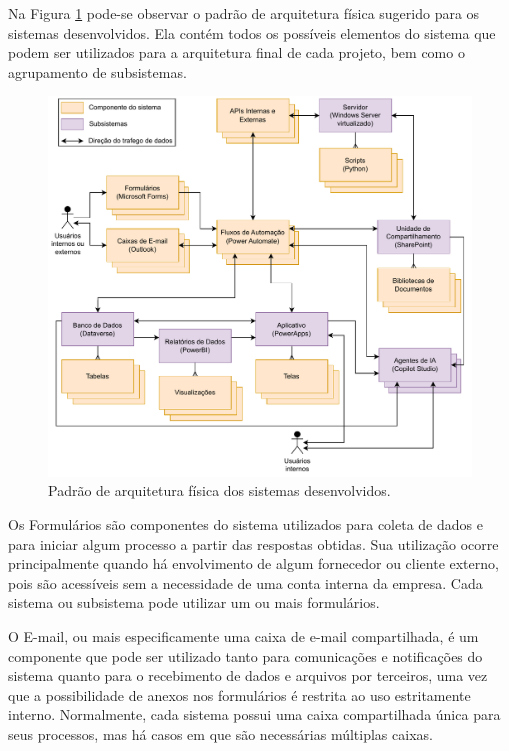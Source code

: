 	Na Figura \ref{fig:metodologia:arquiteturaFisica} pode-se observar o padrão de arquitetura física sugerido para os sistemas desenvolvidos. Ela contém todos os possíveis elementos do sistema que podem ser utilizados para a arquitetura final de cada projeto, bem como o agrupamento de subsistemas.

	\begin{figure}[h]
		\centering
		\includegraphics[width=1\textwidth]{./figuras/arquiteturaFisica.pdf}
		\caption{Padrão de arquitetura física dos sistemas desenvolvidos.}
		\label{fig:metodologia:arquiteturaFisica}
	\end{figure}

	Os Formulários são componentes do sistema utilizados para coleta de dados e para iniciar algum processo a partir das respostas obtidas. Sua utilização ocorre principalmente quando há envolvimento de algum fornecedor ou cliente externo, pois são acessíveis sem a necessidade de uma conta interna da empresa. Cada sistema ou subsistema pode utilizar um ou mais formulários.

	O E-mail, ou mais especificamente uma caixa de e-mail compartilhada, é um componente que pode ser utilizado tanto para comunicações e notificações do sistema quanto para o recebimento de dados e arquivos por terceiros, uma vez que a possibilidade de anexos nos formulários é restrita ao uso estritamente interno. Normalmente, cada sistema possui uma caixa compartilhada única para seus processos, mas há casos em que são necessárias múltiplas caixas.

